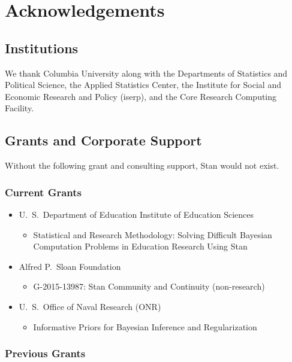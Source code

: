 \chapter*{Acknowledgements}

\section*{Institutions}

We thank Columbia University along with the Departments of
Statistics and Political Science, the Applied Statistics Center, the
Institute for Social and Economic Research and Policy ({\sc iserp}),
and the Core Research Computing Facility.

\section*{Grants and Corporate Support}

Without the following grant and consulting support, Stan would not exist.

\subsection*{Current Grants}

\begin{itemize}
\item
 U.~S.\ Department of Education Institute of Education Sciences
\begin{itemize}\small
\item Statistical and Research Methodology: Solving
Difficult Bayesian Computation Problems in Education Research Using Stan
\end{itemize}
\item  Alfred P.\ Sloan Foundation
\begin{itemize}\small
\item G-2015-13987: Stan Community and Continuity (non-research)
\end{itemize}
\item U.~S.\ Office of Naval Research (ONR)
\begin{itemize}\small
\item Informative Priors for Bayesian Inference and Regularization
\end{itemize}
\end{itemize}
%


\subsection*{Previous Grants}

